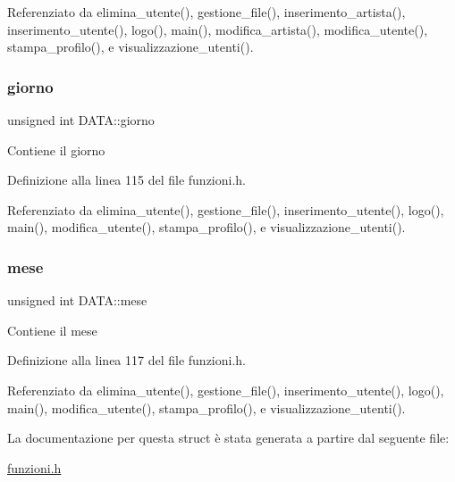 Referenziato da elimina\+\_\+utente(), gestione\+\_\+file(), inserimento\+\_\+artista(), inserimento\+\_\+utente(), logo(), main(), modifica\+\_\+artista(), modifica\+\_\+utente(), stampa\+\_\+profilo(), e visualizzazione\+\_\+utenti().

\mbox{\label{struct_d_a_t_a_a5b7ee538f851d6654690c7abd5a73e95}} 
\subsubsection{\texorpdfstring{giorno}{giorno}}
{\footnotesize\ttfamily unsigned int D\+A\+T\+A\+::giorno}

Contiene il giorno 

Definizione alla linea 115 del file funzioni.\+h.



Referenziato da elimina\+\_\+utente(), gestione\+\_\+file(), inserimento\+\_\+utente(), logo(), main(), modifica\+\_\+utente(), stampa\+\_\+profilo(), e visualizzazione\+\_\+utenti().

\mbox{\label{struct_d_a_t_a_a01ae59e2eaf050acfab59d94732ab535}} 
\subsubsection{\texorpdfstring{mese}{mese}}
{\footnotesize\ttfamily unsigned int D\+A\+T\+A\+::mese}

Contiene il mese 

Definizione alla linea 117 del file funzioni.\+h.



Referenziato da elimina\+\_\+utente(), gestione\+\_\+file(), inserimento\+\_\+utente(), logo(), main(), modifica\+\_\+utente(), stampa\+\_\+profilo(), e visualizzazione\+\_\+utenti().



La documentazione per questa struct è stata generata a partire dal seguente file\+:\begin{DoxyCompactItemize}
\item 
\mbox{\hyperlink{funzioni_8h}{funzioni.\+h}}\end{DoxyCompactItemize}
